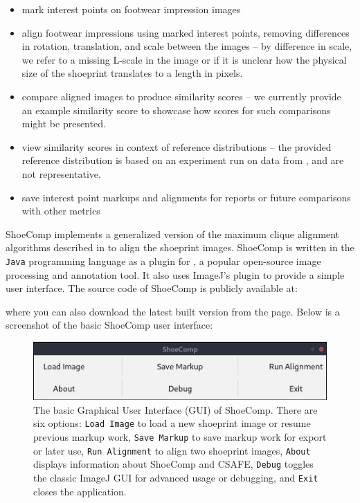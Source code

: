 \documentclass{csafedoc}
\begin{document}
\begin{itemize}
	\item mark interest points on footwear impression images
	\item align footwear impressions using marked interest points, removing differences in
	      rotation, translation, and scale between the images -- by difference in scale, we
	      refer to a missing L-scale in the image or if it is unclear how the physical size of the
	      shoeprint translates to a length in pixels.
	\item compare aligned images to produce similarity scores -- we currently provide an
	      example similarity score to showcase how scores for such comparisons might be presented.
	\item view similarity scores in context of reference distributions -- the provided reference
	      distribution is based on an experiment run on data from \cite{soyoung}, and are
	      not representative.
	\item save interest point markups and alignments for reports or future comparisons with other metrics
\end{itemize}

ShoeComp implements a generalized version of the maximum clique alignment algorithms
described in \cite{soyoung, gvs1} to align the shoeprint images. ShoeComp is written in
the \texttt{Java} programming language as a plugin for
, a popular open-source image processing and
annotation tool. It also uses ImageJ's  plugin to provide a simple user interface. The
source code of ShoeComp is publicly available at:

\begin{center}
\end{center}

where you can also download the latest built version from the
 page. Below is a
screenshot of the basic ShoeComp user interface:

\begin{figure}[htbp]
	\begin{center}
		\includegraphics[width=0.8\linewidth]{images/shoecomp.png}
	\end{center}
	\caption{The basic Graphical User Interface (GUI) of ShoeComp. There are six options:
		\texttt{Load Image} to load a new shoeprint image or resume previous markup work, \texttt{Save
			Markup} to save markup work for export or later use, \texttt{Run Alignment} to align two
		shoeprint images, \texttt{About} displays information about ShoeComp and CSAFE,
		\texttt{Debug} toggles the classic ImageJ GUI for advanced usage or debugging, and
		\texttt{Exit} closes the application.}
	\label{fig:shoecomp_base}
\end{figure}
\end{document}
